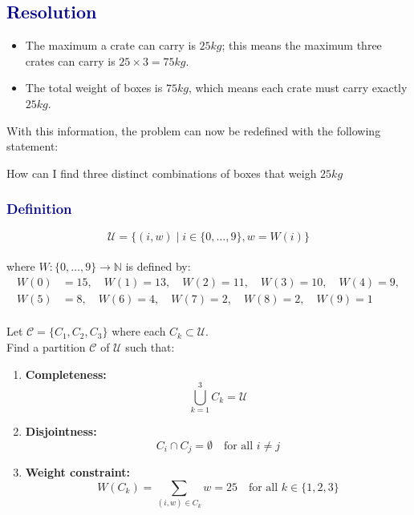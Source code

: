 \documentclass[12pt]{article}
\theoremstyle{definition}
\theoremstyle{plain}
\begin{document}
\subsection*{\textcolor{darkblue}{Resolution}}
\begin{itemize}
  \item The maximum a crate can carry is $25kg$; this means the maximum three crates can carry is $25 \times 3 = 75kg$.
  \item The total weight of boxes is $75kg$, which means each crate must carry exactly $25kg$.
\end{itemize}
With this information, the problem can now be redefined with the following statement:
\vspace{0.5cm}
\begin{tcolorbox}[colback=lightgray, colframe=darkblue, boxrule=1pt]
How can I find three distinct combinations of boxes that weigh $25kg$
\end{tcolorbox}
\vspace{0.3cm}
\noindent
\subsubsection*{\textcolor{darkblue}{Definition}}
\begin{equation}
\mathcal{U} = \{(i, w) \mid i \in \{0, \ldots, 9\}, w = W(i)\}
\end{equation}\\
where $W: \{0, \ldots, 9\} \rightarrow \mathbb{N}$ is defined by:
\begin{align}
W(0) &= 15, \quad W(1) = 13, \quad W(2) = 11, \quad W(3) = 10, \quad W(4) = 9, \\
W(5) &= 8, \quad W(6) = 4, \quad W(7) = 2, \quad W(8) = 2, \quad W(9) = 1
\end{align}\\
Let $\mathcal{C} = \{C_1, C_2, C_3\}$ where each $C_k \subset \mathcal{U}$.\\
Find a partition $\mathcal{C}$ of $\mathcal{U}$ such that:

\begin{enumerate}
    \item \textbf{Completeness:}
    \begin{equation}
    \bigcup_{k=1}^{3} C_k = \mathcal{U}
    \end{equation}
    
    \item \textbf{Disjointness:}
    \begin{equation}
    C_i \cap C_j = \emptyset \quad \text{for all } i \neq j
    \end{equation}
    
    \item \textbf{Weight constraint:}
    \begin{equation}
    W(C_k) = \sum_{(i,w) \in C_k}w = 25 \quad \text{for all } k \in \{1, 2, 3\}
    \end{equation}
\end{enumerate}
\end{document}
